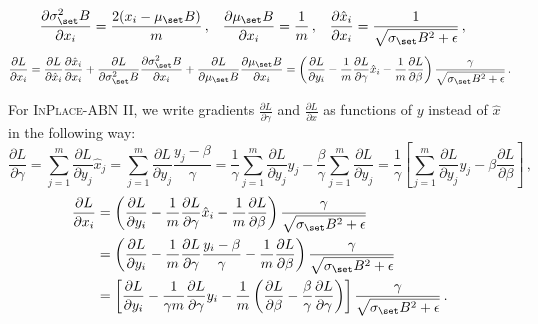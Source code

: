 \documentclass[10pt,twocolumn,letterpaper]{article}
\newcommand{\bnInplace}{\textsc{InPlace-ABN}\xspace}
\begin{document}
\begin{widetext}
\begin{align*}
	&\frac{\partial \sigma^2_\set B}{\partial x_i}=\frac{2(x_i-\mu_\set B)}{m}\,,&
	&\frac{\partial \mu_\set B}{\partial x_i}=\frac{1}{m}\,,&
	&\frac{\partial \hat x_i}{\partial x_i}=\frac{1}{\sqrt{\sigma_\set B^2+\epsilon}}\,,
\end{align*}
\[
	\frac{\partial L}{\partial x_i}=\frac{\partial L}{\partial \hat x_i}\frac{\partial\hat x_i}{\partial x_i}+\frac{\partial L}{\partial \sigma^2_\set B}\frac{\partial \sigma^2_\set B}{\partial x_i}+\frac{\partial L}{\partial \mu_\set B}\frac{\partial \mu_\set B}{\partial x_i}=\left(\frac{\partial L}{\partial y_i}-\frac{1}{m}\frac{\partial L}{\partial \gamma}\hat x_i-\frac{1}{m}\frac{\partial L}{\partial \beta}\right)\frac{\gamma}{\sqrt{\sigma_\set B^2+\epsilon}}\,.
\]

For \bnInplace II, we write gradients $\frac{\partial L}{\partial \gamma}$ and $\frac{\partial L}{\partial x}$ as functions of $y$ instead of $\hat x$ in the following way:
\[
	\frac{\partial L}{\partial \gamma}=\sum_{j=1}^m\frac{\partial L}{\partial y_j}\hat x_j=\sum_{j=1}^m\frac{\partial L}{\partial y_j}\frac{y_j-\beta}{\gamma}=\frac{1}{\gamma}\sum_{j=1}^m\frac{\partial L}{\partial y_j}y_j - \frac{\beta}{\gamma}\sum_{j=1}^m\frac{\partial L}{\partial y_j}=\frac{1}{\gamma}\left[\sum_{j=1}^m\frac{\partial L}{\partial y_j}y_j - \beta\frac{\partial L}{\partial \beta}\right]\,,
\]
\begin{align*}
\frac{\partial L}{\partial x_i}&=\left(\frac{\partial L}{\partial y_i}-\frac{1}{m}\frac{\partial L}{\partial \gamma}\hat x_i-\frac{1}{m}\frac{\partial L}{\partial \beta}\right)\frac{\gamma}{\sqrt{\sigma_\set B^2+\epsilon}}\\
&=\left(\frac{\partial L}{\partial y_i}-\frac{1}{m}\frac{\partial L}{\partial \gamma}\frac{y_i-\beta}{\gamma}-\frac{1}{m}\frac{\partial L}{\partial \beta}\right)\frac{\gamma}{\sqrt{\sigma_\set B^2+\epsilon}}\\
&=\left[\frac{\partial L}{\partial y_i}-\frac{1}{\gamma m}\frac{\partial L}{\partial \gamma}y_i-\frac{1}{m}\left(\frac{\partial L}{\partial \beta}-\frac{\beta}{\gamma}\frac{\partial L}{\partial \gamma}\right)\right]\frac{\gamma}{\sqrt{\sigma_\set B^2+\epsilon}}\,.
\end{align*}

\end{widetext}
{\small


}
\end{document}
